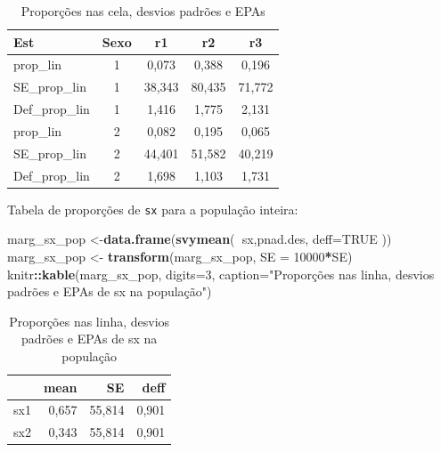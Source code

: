 \documentclass[]{book}
\newenvironment{Shaded}{\begin{snugshade}}{\end{snugshade}}
\newcommand{\KeywordTok}[1]{\textcolor[rgb]{0.13,0.29,0.53}{\textbf{#1}}}
\newcommand{\DataTypeTok}[1]{\textcolor[rgb]{0.13,0.29,0.53}{#1}}
\newcommand{\DecValTok}[1]{\textcolor[rgb]{0.00,0.00,0.81}{#1}}
\newcommand{\StringTok}[1]{\textcolor[rgb]{0.31,0.60,0.02}{#1}}
\newcommand{\OtherTok}[1]{\textcolor[rgb]{0.56,0.35,0.01}{#1}}
\newcommand{\OperatorTok}[1]{\textcolor[rgb]{0.81,0.36,0.00}{\textbf{#1}}}
\newcommand{\NormalTok}[1]{#1}
\theoremstyle{definition}
\theoremstyle{definition}
\theoremstyle{definition}
\theoremstyle{remark}
\begin{document}
\begin{table}

\caption{\label{tab:propcelas}Proporções nas cela, desvios padrões e EPAs}
\centering
\begin{tabular}[t]{lcccc}
\toprule
Est & Sexo & r1 & r2 & r3\\
\midrule
prop\_lin & 1 & 0,073 & 0,388 & 0,196\\
SE\_prop\_lin & 1 & 38,343 & 80,435 & 71,772\\
Def\_prop\_lin & 1 & 1,416 & 1,775 & 2,131\\
prop\_lin & 2 & 0,082 & 0,195 & 0,065\\
SE\_prop\_lin & 2 & 44,401 & 51,582 & 40,219\\
Def\_prop\_lin & 2 & 1,698 & 1,103 & 1,731\\
\bottomrule
\end{tabular}
\end{table}

Tabela de proporções de \texttt{sx} para a população inteira:

\begin{Shaded}
\begin{Highlighting}[]
\NormalTok{marg_sx_pop <-}\KeywordTok{data.frame}\NormalTok{(}\KeywordTok{svymean}\NormalTok{(}\OperatorTok{~}\NormalTok{sx,pnad.des, }\DataTypeTok{deff=}\OtherTok{TRUE}\NormalTok{ ))}
\NormalTok{marg_sx_pop <-}\StringTok{ }\KeywordTok{transform}\NormalTok{(marg_sx_pop, }\DataTypeTok{SE =} \DecValTok{10000}\OperatorTok{*}\NormalTok{SE)}
\NormalTok{knitr}\OperatorTok{::}\KeywordTok{kable}\NormalTok{(marg_sx_pop, }\DataTypeTok{digits=}\DecValTok{3}\NormalTok{,}
  \DataTypeTok{caption=}\StringTok{"Proporções nas linha, desvios padrões e EPAs de sx na população"}\NormalTok{)}
\end{Highlighting}
\end{Shaded}

\begin{table}

\caption{\label{tab:unnamed-chunk-4}Proporções nas linha, desvios padrões e EPAs de sx na população}
\centering
\begin{tabular}[t]{l|r|r|r}
\hline
  & mean & SE & deff\\
\hline
sx1 & 0,657 & 55,814 & 0,901\\
\hline
sx2 & 0,343 & 55,814 & 0,901\\
\hline
\end{tabular}
\end{table}
\end{document}
